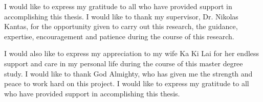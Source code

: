 

\begin{acknowledgements}      %
 I would like to express my gratitude to all who have provided support in accomplishing this thesis. I would like to thank my supervisor, Dr. Nikolas Kantas, for the opportunity given to carry out this research, the guidance, expertise, encouragement and patience during the course of this research.
  
 I would also like to express my appreciation to my wife Ka Ki Lai for her endless support and care in my personal life during the course of this master degree study. I would like to thank God Almighty, who has given me the strength and peace to work hard on this project. I would like to express my gratitude to all who have provided support in accomplishing this thesis. 

\end{acknowledgements}


